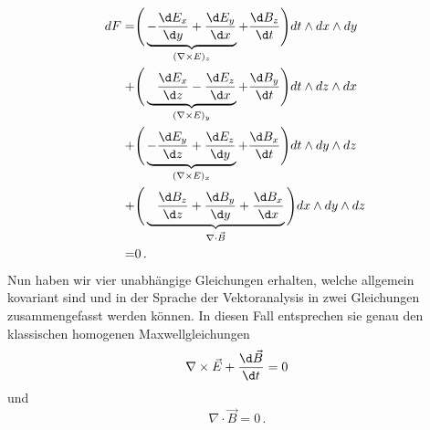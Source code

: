 \begin{align*}
	dF =
	&\Bigg( \underbrace{ - \frac{\d E_x}{\d y} + \frac{\d E_y}{\d x}}_{(\nabla \times E)_z} + \frac{\d B_z}{\d t} \Bigg) dt \wedge dx \wedge dy
	\\
	+&\Bigg( \underbrace{ \phantom{+} \frac{\d E_x}{\d z} - \frac{\d E_z}{\d x}}_{(\nabla \times E)_y} + \frac{\d B_y}{\d t} \Bigg) dt \wedge dz \wedge dx
	\\
	+&\Bigg( \underbrace{ - \frac{\d E_y}{\d z} + \frac{\d E_z}{\d y}}_{(\nabla \times E)_x} + \frac{\d B_x}{\d t} \Bigg) dt \wedge dy \wedge dz
	\\
	+&\Bigg( \underbrace{ \phantom{+} \frac{\d B_z}{\d z} + \frac{\d B_y}{\d y} + \frac{\d B_x}{\d x}}_{\nabla \cdot \vec{B}} \Bigg) dx \wedge dy \wedge dz  \, \,
	\\
	\phantom{=} =&0 \, .
\end{align*}
Nun haben wir vier unabhängige Gleichungen erhalten, welche allgemein kovariant sind und in der Sprache der Vektoranalysis in zwei Gleichungen zusammengefasst werden können. 
In diesen Fall entsprechen sie genau den klassischen homogenen Maxwellgleichungen
\[
\nabla \times \vec{E} + \frac{\d \vec{B}}{\d t} = 0
\]
und
\[
\nabla \cdot \vec{B} = 0 \, .
\]
